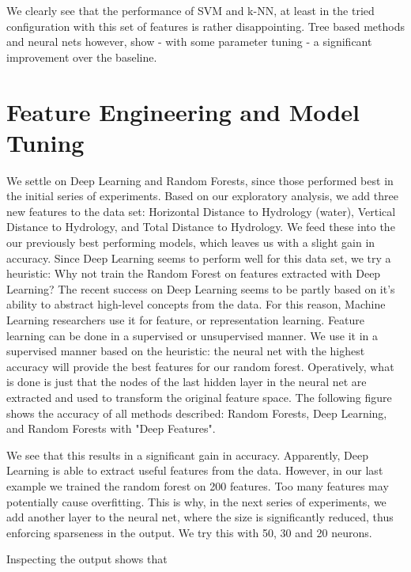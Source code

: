 \documentclass[paper=a4, fontsize=11pt]{scrartcl}
\numberwithin{equation}{section} %
\numberwithin{figure}{section} %
\numberwithin{table}{section} %
\begin{document}
We clearly see that the performance of SVM and k-NN, at least in the tried configuration with this set of features is rather disappointing. Tree based methods  and neural nets however, show - with some parameter tuning - a significant improvement over the baseline. 

\section{Feature Engineering and Model Tuning}
We settle on Deep Learning and Random Forests, since those performed best in the initial series of experiments. Based on our exploratory analysis, we add three new features to the data set: Horizontal Distance to Hydrology (water), Vertical Distance to Hydrology, and Total Distance to Hydrology. We feed these into the our previously best performing models, which leaves us with a slight gain in accuracy. 
Since Deep Learning seems to perform well for this data set, we try a heuristic: Why not train the Random Forest on features extracted with Deep Learning? The recent success on Deep Learning seems to be partly based on it's ability to abstract high-level concepts from the data. For this reason, Machine Learning researchers use it for feature, or representation learning. Feature learning can be done in a supervised or unsupervised manner. We use it in a supervised manner based on the heuristic: the neural net with the highest accuracy will provide the best features for our random forest. Operatively, what is done is just that the nodes of the last hidden layer in the neural net are extracted and used to transform the original feature space. The following figure shows the accuracy of all methods described: Random Forests, Deep Learning, and Random Forests with "Deep Features". 


We see that this results in a significant gain in accuracy. Apparently, Deep Learning is able to extract useful features from the data. However, in our last example we trained the random forest on 200 features. Too many features may potentially cause overfitting. This is why, in the next series of experiments, we add another layer to the neural net, where the size is significantly reduced, thus enforcing sparseness in the output. We try this with 50, 30 and 20 neurons. 


Inspecting the output shows that
\end{document}
